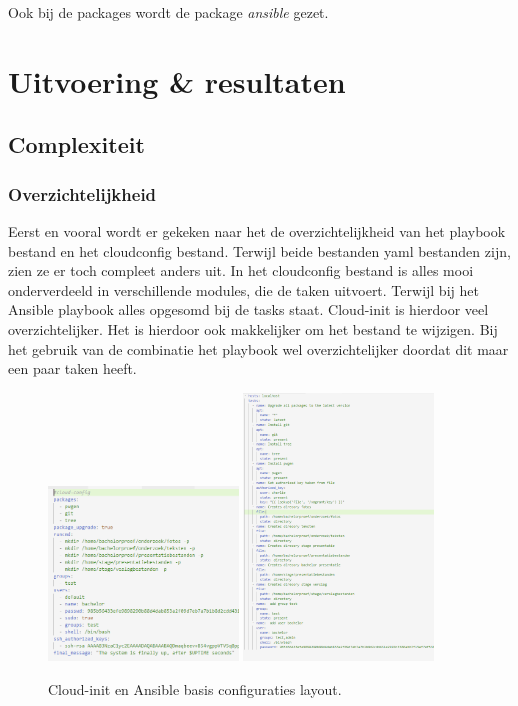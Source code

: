 Ook bij de packages wordt de package \textit{ansible} gezet.

\section{Uitvoering \& resultaten}
\subsection{Complexiteit}
\subsubsection{Overzichtelijkheid}
Eerst en vooral wordt er gekeken naar het de overzichtelijkheid van het playbook bestand en het cloudconfig bestand. Terwijl beide bestanden yaml bestanden zijn, zien ze er toch compleet anders uit. In het cloudconfig bestand is alles mooi onderverdeeld in verschillende modules, die de taken uitvoert. Terwijl bij het Ansible playbook alles opgesomd bij de tasks staat. Cloud-init is hierdoor veel overzichtelijker. Het is hierdoor ook makkelijker om het bestand te wijzigen. Bij het gebruik van de combinatie het playbook wel overzichtelijker doordat dit maar een paar taken heeft.
\begin{figure}[!htb]
    \centering
    {{\includegraphics[width=0.45\textwidth]{img/basiscloud.png} }}%
    \qquad
    {{\includegraphics[width=0.45\textwidth]{img/basisansible.png} }}%
    \caption{Cloud-init en Ansible basis configuraties layout.}%
    \label{fig:basisconf_layout}%
\end{figure}

